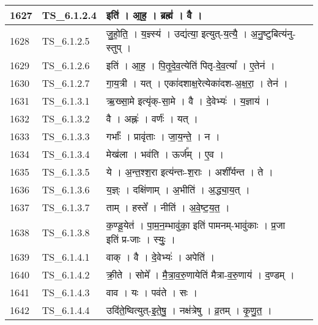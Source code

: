 \documentclass[17pt]{extarticle}
\begin{document}
\begin{longtable}{||p{0.4in}||p{0.9in}||p{4.0in}||p{0.9in}||}
        \hline
            1627 & TS\_6.1.2.4 & इति॑   ।   आ॒ह॒   ।   ब्रह्म॑   ।   वै   ।    &      \\
        \hline
            1628 & TS\_6.1.2.5 & जु॒हो॒ति॒   ।   य॒ज्ञ्स्य॑   ।   उद्य॑त्या॒ इत्युत्{-}य॒त्यै॒   ।   अ॒नु॒ष्टुबित्य॑नु{-}स्तुप्   ।    &      \\
        \hline
            1629 & TS\_6.1.2.6 & इति॑   ।   आ॒ह॒   ।   पि॒तृ॒दे॒व॒त्येति॑ पितृ{-}दे॒व॒त्या᳚   ।   ए॒तेन॑   ।    &      \\
        \hline
            1630 & TS\_6.1.2.7 & गा॒य॒त्री   ।   यत्   ।   एका॑दशाक्ष॒रेत्येका॑दश{-}अ॒क्ष॒रा॒   ।   तेन॑   ।    &      \\
        \hline
            1631 & TS\_6.1.3.1 & ऋ॒ख्सा॒मे इत्यृ॑क्{-}सा॒मे   ।   वै   ।   दे॒वेभ्यः॑   ।   य॒ज्ञाय॑   ।    &      \\
        \hline
            1632 & TS\_6.1.3.2 & वै   ।   अह्नः॑   ।   वर्णः॑   ।   यत्   ।    &      \\
        \hline
            1633 & TS\_6.1.3.3 & गर्भाः᳚   ।   प्रावृ॑ताः   ।   जा॒य॒न्ते॒   ।   न   ।    &      \\
        \hline
            1634 & TS\_6.1.3.4 & मेख॑ला   ।   भव॑ति   ।   ऊर्ज᳚म्   ।   ए॒व   ।    &      \\
        \hline
            1635 & TS\_6.1.3.5 & ये   ।   अ॒न्त॒श्श॒रा इत्य॑न्तः{-}श॒राः   ।   अशी᳚र्यन्त   ।   ते   ।    &      \\
        \hline
            1636 & TS\_6.1.3.6 & य॒ज्ञ्ः   ।   दक्षि॑णाम्   ।   अ॒भीति॑   ।   अ॒द्ध्या॒य॒त्   ।    &      \\
        \hline
            1637 & TS\_6.1.3.7 & ताम्   ।   हस्ते᳚   ।   नीति॑   ।   अ॒वे॒ष्ट॒य॒त॒   ।    &      \\
        \hline
            1638 & TS\_6.1.3.8 & क॒ण्डू॒येत॑   ।   पा॒म॒न॒म्भावु॑का॒ इति॑ पामनम्{-}भावु॑काः   ।   प्र॒जा इति॑ प्र{-}जाः   ।   स्युः॒   ।    &      \\
        \hline
            1639 & TS\_6.1.4.1 & वाक्   ।   वै   ।   दे॒वेभ्यः॑   ।   अपेति॑   ।    &      \\
        \hline
            1640 & TS\_6.1.4.2 & क्री॒ते   ।   सोमे᳚   ।   मै॒त्रा॒व॒रु॒णायेति॑ मैत्रा{-}व॒रु॒णाय॑   ।   द॒ण्डम्   ।    &      \\
        \hline
            1641 & TS\_6.1.4.3 & वाव   ।   यः   ।   पव॑ते   ।   सः   ।    &      \\
        \hline
            1642 & TS\_6.1.4.4 & उदि॑ते॒ष्वित्युत्{-}इ॒ते॒षु॒   ।   नक्ष॑त्रेषु   ।   व्र॒तम्   ।   कृ॒णु॒त॒   ।    &      \\

\end{longtable}
\end{document}
